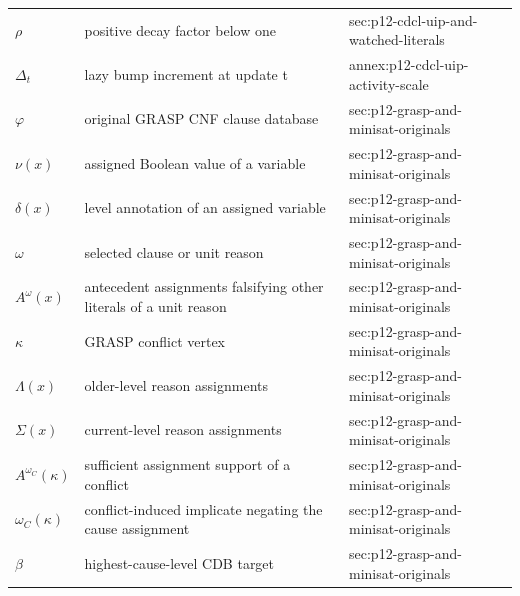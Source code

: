 \begin{longtable}{@{}p{}p{}p{}@{}}
\(\rho\) & positive decay factor below one & sec:\allowbreak{}p12-\allowbreak{}cdcl-\allowbreak{}uip-\allowbreak{}and-\allowbreak{}watched-\allowbreak{}literals \\
\(\Delta_t\) & lazy bump increment at update t & annex:\allowbreak{}p12-\allowbreak{}cdcl-\allowbreak{}uip-\allowbreak{}activity-\allowbreak{}scale \\
\(\varphi\) & original GRASP CNF clause database & sec:\allowbreak{}p12-\allowbreak{}grasp-\allowbreak{}and-\allowbreak{}minisat-\allowbreak{}originals \\
\(\nu(x)\) & assigned Boolean value of a variable & sec:\allowbreak{}p12-\allowbreak{}grasp-\allowbreak{}and-\allowbreak{}minisat-\allowbreak{}originals \\
\(\delta(x)\) & level annotation of an assigned variable & sec:\allowbreak{}p12-\allowbreak{}grasp-\allowbreak{}and-\allowbreak{}minisat-\allowbreak{}originals \\
\(\omega\) & selected clause or unit reason & sec:\allowbreak{}p12-\allowbreak{}grasp-\allowbreak{}and-\allowbreak{}minisat-\allowbreak{}originals \\
\(A^\omega(x)\) & antecedent assignments falsifying other literals of a unit reason & sec:\allowbreak{}p12-\allowbreak{}grasp-\allowbreak{}and-\allowbreak{}minisat-\allowbreak{}originals \\
\(\kappa\) & GRASP conflict vertex & sec:\allowbreak{}p12-\allowbreak{}grasp-\allowbreak{}and-\allowbreak{}minisat-\allowbreak{}originals \\
\(\Lambda(x)\) & older-level reason assignments & sec:\allowbreak{}p12-\allowbreak{}grasp-\allowbreak{}and-\allowbreak{}minisat-\allowbreak{}originals \\
\(\Sigma(x)\) & current-level reason assignments & sec:\allowbreak{}p12-\allowbreak{}grasp-\allowbreak{}and-\allowbreak{}minisat-\allowbreak{}originals \\
\(A^{\omega_C}(\kappa)\) & sufficient assignment support of a conflict & sec:\allowbreak{}p12-\allowbreak{}grasp-\allowbreak{}and-\allowbreak{}minisat-\allowbreak{}originals \\
\(\omega_C(\kappa)\) & conflict-induced implicate negating the cause assignment & sec:\allowbreak{}p12-\allowbreak{}grasp-\allowbreak{}and-\allowbreak{}minisat-\allowbreak{}originals \\
\(\beta\) & highest-cause-level CDB target & sec:\allowbreak{}p12-\allowbreak{}grasp-\allowbreak{}and-\allowbreak{}minisat-\allowbreak{}originals \\

\end{longtable}
